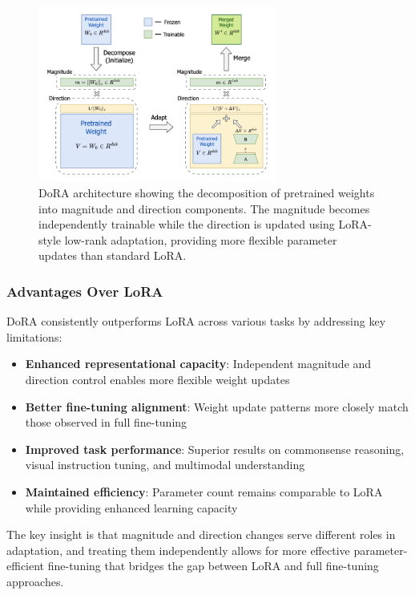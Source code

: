 \begin{figure}[H]
\centering
\includegraphics[width=0.7\textwidth]{figures/DoRA.png}
\caption{DoRA architecture showing the decomposition of pretrained weights into magnitude and direction components. The magnitude becomes independently trainable while the direction is updated using LoRA-style low-rank adaptation, providing more flexible parameter updates than standard LoRA.}
\label{fig:dora_architecture}
\end{figure}

\subsubsection{Advantages Over LoRA}

DoRA consistently outperforms LoRA across various tasks by addressing key limitations:

\begin{itemize}
    \item \textbf{Enhanced representational capacity}: Independent magnitude and direction control enables more flexible weight updates
    \item \textbf{Better fine-tuning alignment}: Weight update patterns more closely match those observed in full fine-tuning
    \item \textbf{Improved task performance}: Superior results on commonsense reasoning, visual instruction tuning, and multimodal understanding
    \item \textbf{Maintained efficiency}: Parameter count remains comparable to LoRA while providing enhanced learning capacity
\end{itemize}

The key insight is that magnitude and direction changes serve different roles in adaptation, and treating them independently allows for more effective parameter-efficient fine-tuning that bridges the gap between LoRA and full fine-tuning approaches.

